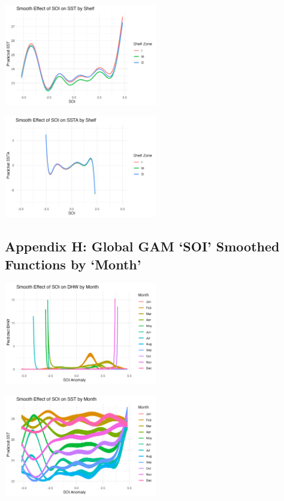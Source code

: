\documentclass[letterpaper,9pt,twocolumn,twoside,]{pinp}
\begin{document}
\begin{center}
\includegraphics[width=0.5\textwidth]{report_images/soi_shelf_sst.png}
\end{center}

\begin{center}
\includegraphics[width=0.5\textwidth]{report_images/soi_shelf_ssta.png}
\end{center}

\subsection{Appendix H: Global GAM `SOI' Smoothed Functions by
`Month'}\label{appendix-h-global-gam-soi-smoothed-functions-by-month}

\begin{center}
\includegraphics[width=0.5\textwidth]{report_images/soi_month_dhw.png}
\end{center}

\begin{center}
\includegraphics[width=0.5\textwidth]{report_images/soi_month_sst.png}
\end{center}
\end{document}
